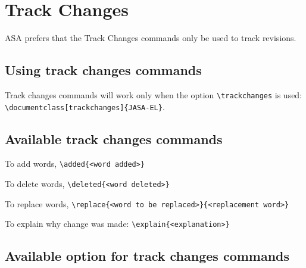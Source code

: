 \documentclass[trackchanges]{JASA-EL}
\begin{document}
\clearpage






\section{Track Changes}
ASA prefers that the Track Changes commands only be used to
track revisions.

\subsection{Using track changes commands}
Track changes commands will work only when the option
\verb+\trackchanges+ is used:\\
\verb+\documentclass[trackchanges]{JASA-EL}+.

\subsection{Available track changes commands}

To add words, \verb+\added{<word added>}+

To delete words, \verb+\deleted{<word deleted>}+

To replace words, \verb+\replace{<word to be replaced>}{<replacement word>}+

To explain why change was made: \verb+\explain{<explanation>}+


\subsection{Available option for track changes commands}
\end{document}
